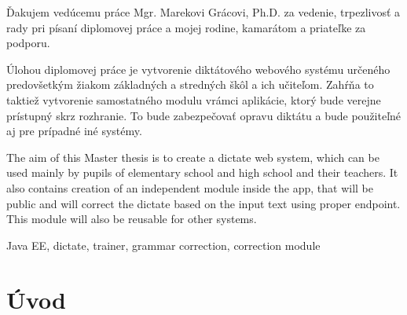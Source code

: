\documentclass[12pt,oneside]{fithesis2}
\begin{document}
  \FrontMatter                    %
    \ThesisTitlePage                %
    \begin{ThesisDeclaration}       %
      \DeclarationText
      \AdvisorName
    \end{ThesisDeclaration}
    \begin{ThesisThanks}            %
      Ďakujem vedúcemu práce Mgr. Marekovi Grácovi, Ph.D. za vedenie, trpezlivosť a rady pri písaní diplomovej
       práce a mojej rodine, kamarátom a priateľke za podporu.
    \end{ThesisThanks}
    \begin{ThesisAbstract}          %
      Úlohou diplomovej práce je vytvorenie diktátového webového systému určeného predovšetkým žiakom základných
      a stredných škôl a ich učiteľom. Zahŕňa to taktiež vytvorenie samostatného modulu vrámci aplikácie, ktorý
      bude verejne prístupný skrz rozhranie. To bude zabezpečovať opravu diktátu a bude použiteľné aj pre
      prípadné iné systémy.
    \end{ThesisAbstract}
    \begin{ThesisAbstracten}          %

      The aim of this Master thesis is to create a dictate web system, which can be used mainly by pupils of
      elementary school and high school and their teachers. It also contains creation of an independent module
      inside the app, that will be public and will correct the dictate based on the input text using proper
      endpoint. This module will also be reusable for other systems.
    \end{ThesisAbstracten}
    \begin{ThesisKeyWords}          %
      Java EE, dictate, trainer, grammar correction, correction module
    \end{ThesisKeyWords}
    \tableofcontents                %
  
  \MainMatter                     %
    \chapter{Úvod}          %
  
\end{document}
